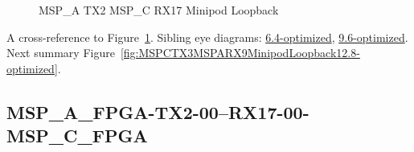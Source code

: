\begin{figure}[h]
\begin{subfigure}{0.33\textwidth}
\hyperref[sec:MSPAFPGATX206RX1706MSPCFPGA12.8-optimized]{}
\end{subfigure}\hspace*{\fill}
\begin{subfigure}{0.33\textwidth}
\hyperref[sec:MSPAFPGATX207RX1707MSPCFPGA12.8-optimized]{}
\end{subfigure}\hspace*{\fill}
\begin{subfigure}{0.33\textwidth}
\hyperref[sec:MSPAFPGATX208RX1708MSPCFPGA12.8-optimized]{}
\end{subfigure}

\begin{subfigure}{0.33\textwidth}
\hyperref[sec:MSPAFPGATX209RX1709MSPCFPGA12.8-optimized]{}
\end{subfigure}\hspace*{\fill}
\begin{subfigure}{0.33\textwidth}
\hyperref[sec:MSPAFPGATX210RX1710MSPCFPGA12.8-optimized]{}
\end{subfigure}\hspace*{\fill}
\begin{subfigure}{0.33\textwidth}
\hyperref[sec:MSPAFPGATX211RX1711MSPCFPGA12.8-optimized]{}
\end{subfigure}

\caption{MSP\_A TX2 MSP\_C RX17 Minipod Loopback} \label{fig:MSPATX2MSPCRX17MinipodLoopback12.8-optimized}
\end{figure}

A cross-reference to Figure~\ref{fig:MSPATX2MSPCRX17MinipodLoopback12.8-optimized}.
Sibling eye diagrams: \hyperref[sec:MSPATX2MSPCRX17MinipodLoopback6.4-optimized]{6.4-optimized}, \hyperref[sec:MSPATX2MSPCRX17MinipodLoopback9.6-optimized]{9.6-optimized}. \\
Next summary Figure~\ref{fig:MSPCTX3MSPARX9MinipodLoopback12.8-optimized}.
\clearpage
% 
\subsection{MSP\_A\_FPGA-TX2-00--RX17-00-MSP\_C\_FPGA}\label{sec:MSPAFPGATX200RX1700MSPCFPGA12.8-optimized}

